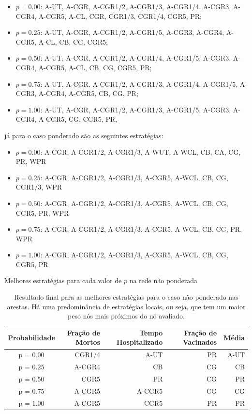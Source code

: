 \begin{itemize}
    \item \( p = 0.00 \): A-UT, A-CGR, A-CGR1/2, A-CGR1/3, A-CGR1/4, A-CGR3, A-CGR4, A-CGR5, A-CL, CGR, CGR1/3, CGR1/4, CGR5, PR;
    \item \( p = 0.25 \): A-UT, A-CGR, A-CGR1/2, A-CGR1/5, A-CGR3, A-CGR4, A-CGR5, A-CL, CB, CG, CGR5;
    \item \( p = 0.50 \): A-UT, A-CGR, A-CGR1/2, A-CGR1/4, A-CGR1/5, A-CGR3, A-CGR4, A-CGR5, A-CL, CB, CG, CGR5, PR;
    \item \( p = 0.75 \): A-UT, A-CGR, A-CGR1/2, A-CGR1/3, A-CGR1/4, A-CGR1/5, A-CGR3, A-CGR4, A-CGR5, CB, CG, PR;
    \item \( p = 1.00 \): A-UT, A-CGR, A-CGR1/2, A-CGR1/3, A-CGR1/5, A-CGR3, A-CGR4, A-CGR5, CG, CGR5, PR,
\end{itemize}

já para o caso ponderado são as seguintes estratégias:

\begin{itemize}
    \item \( p = 0.00 \): A-CGR, A-CGR1/2, A-CGR1/3, A-WUT, A-WCL, CB, CA, CG, PR, WPR
    \item \( p = 0.25 \): A-CGR, A-CGR1/2, A-CGR1/3, A-CGR5, A-WCL, CB, CG, CGR1/3, WPR
    \item \( p = 0.50 \): A-CGR, A-CGR1/2, A-CGR1/3, A-CGR5, A-WCL, CB, CG, CGR5, PR, WPR
    \item \( p = 0.75 \): A-CGR, A-CGR1/2, A-CGR1/3, A-CGR5, A-WCL, CB, CG, PR, WPR
    \item \( p = 1.00 \): A-CGR, A-CGR1/2, A-CGR1/3, A-CGR5, A-WCL, CB, CG, CGR5, PR
  \end{itemize}

\begin{table}[H]
    \caption{Melhores estratégias para cada valor de $p$ na rede não ponderada}
    \captionsetup{width=13.5cm}
    \begin{tabular}{crrrr}
    \toprule
    Probabilidade & Fração de Mortos & Tempo Hospitalizado & Fração de Vacinados & Média \\
    \midrule
    \midrule
    p = 0.00      & CGR1/4 & A-UT & PR & A-UT\\
    p = 0.25      & A-CGR4 & CB & CG & CB\\
    p = 0.50      & CGR5 & PR & CG & PR\\
    p = 0.75      & A-CGR5 & A-CGR5 & CG & CG\\
    p = 1.00      & A-CGR5 & CGR5 & PR & PR\\    
    \bottomrule
\end{tabular}
\caption*{Resultado final para as melhores estratégias para o caso não ponderado nas arestas. Há uma predominância de estratégias locais, ou seja, que tem um maior peso nós mais próximos do nó avaliado.}
\label{tabela:melhoresnponderado}
\end{table}

